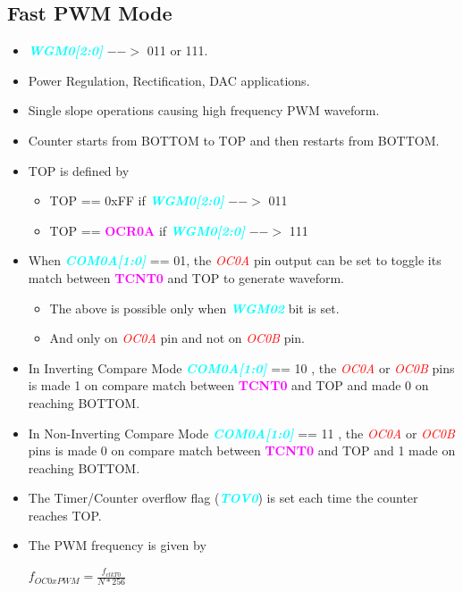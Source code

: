 \documentclass{article}
\newcommand{\bitFormat}[1]{\emph{\textbf{\textcolor{cyan}{#1}}}}
\newcommand{\regFormat}[1]{\textbf{\textcolor{magenta}{#1}}}
\newcommand{\pinFormat}[1]{\emph{\textcolor{red}{#1}}}
\begin{document}
\subsection{Fast PWM Mode}
\begin{itemize}
    \item \bitFormat{WGM0[2:0]} $-->$ 011 or 111.
    \item Power Regulation, Rectification, DAC applications.
    \item Single slope operations causing high frequency PWM waveform.
    \item Counter starts from BOTTOM to TOP and then restarts from BOTTOM.
    \item TOP is defined by
    \begin{itemize}
        \item TOP == 0xFF if \bitFormat{WGM0[2:0]} $-->$ 011
        \item TOP == \regFormat{OCR0A} if \bitFormat{WGM0[2:0]} $-->$ 111
    \end{itemize}
    \item  When \bitFormat{COM0A[1:0]} == 01, the \pinFormat{OC0A} pin output can be set to toggle its match between \regFormat{TCNT0} and TOP to generate waveform.
    \begin{itemize}
        \item The above is possible only when \bitFormat{WGM02} bit is set.
        \item And only on \pinFormat{OC0A} pin and not on \pinFormat{OC0B} pin.
    \end{itemize}
    \item In Inverting Compare Mode \bitFormat{COM0A[1:0]} == 10 , the \pinFormat{OC0A} or \pinFormat{OC0B} pins is made 1 on compare match between \regFormat{TCNT0} and TOP and made 0 on reaching BOTTOM.
    \item In Non-Inverting Compare Mode \bitFormat{COM0A[1:0]} == 11 , the \pinFormat{OC0A} or \pinFormat{OC0B} pins is made 0 on compare match between \regFormat{TCNT0} and TOP and 1 made  on reaching BOTTOM.
    \item The Timer/Counter overflow flag (\bitFormat{TOV0}) is set each time the counter reaches TOP.
    \item The PWM frequency is given by 
    \begin{center}
        { \Large $f_{OC0xPWM} = \frac{f_{clkT0}}{N * 256}$ }
    \end{center}
\end{itemize}
\end{document}
